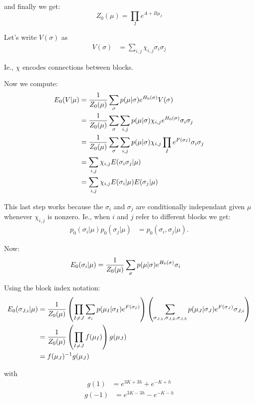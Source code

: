 \documentclass[11pt]{article}
\begin{document}
and finally we get:
$$\boxed{Z_{0}(\mu) = \prod_{I} e^{A+B\mu_{I}}}$$


Let's write $V(\sigma)$ as
\begin{align*}
V(\sigma) &= \sum_{i,j} \chi_{i,j}\sigma_{i}\sigma_{j}
\end{align*}

Ie., $\chi$ encodes connections between blocks.

Now we compute:
\begin{align*}
E_{0}(V | \mu) &= {{1} \over {Z_{0}(\mu)}}\sum_{\sigma} p(\mu | \sigma)e^{H_{0}(\sigma)}V(\sigma)\\
 &= {{1} \over {Z_{0}(\mu)}}\sum_{\sigma} \sum_{i,j} p(\mu | \sigma)\chi_{i,j}e^{H_{0}(\sigma)}\sigma_{i}\sigma_{j}\\
 &= {{1} \over {Z_{0}(\mu)}}\sum_{\sigma} \sum_{i,j} p(\mu | \sigma)\chi_{i,j}\prod_{I} e^{F(\sigma_{I})}\sigma_{i}\sigma_{j}\\
 &= \sum_{i,j} \chi_{i,j}E(\sigma_{i}\sigma_{j} | \mu)\\
 &= \sum_{i,j} \chi_{i,j}E(\sigma_{i} | \mu)E(\sigma_{j} | \mu)
\end{align*}

This last step works because the $\sigma_i$ and $\sigma_j$ are
conditionally independant given $\mu$ whenever $\chi_{i, j}$ is
nonzero. Ie., when $i$ and $j$ refer to different blocks we get:
\begin{align*}
p_{0}(\sigma_{i} | \mu)p_{0}(\sigma_{j} | \mu) &= p_{0}(\sigma_{i}, \sigma_{j} | \mu).
\end{align*}

Now:
\begin{align*}
E_{0}(\sigma_{i} | \mu) &= {{1} \over {Z_{0}(\mu)}}\sum_{\sigma} p(\mu | \sigma)e^{H_{0}(\sigma)}\sigma_{i}
\end{align*}

Using the block index notation:
\begin{align*}
E_{0}(\sigma_{J,i} | \mu) &= {{1} \over {Z_{0}(\mu)}}\left({\prod_{I \not = J} \sum_{\sigma_{i}} p(\mu_{I} | \sigma_{I})e^{F(\sigma_{I})}}\right)\left({\sum_{\sigma_{J,1},\sigma_{J,2},\sigma_{J,3}} p(\mu_{J} | \sigma_{J})e^{F(\sigma_{J})}\sigma_{J,i}}\right)\\
 &= {{1} \over {Z_{0}(\mu)}}\left({\prod_{I \not = J} f(\mu_{I})}\right)g(\mu_{J})\\
 &= f(\mu_{J})^{-1}g(\mu_{J})
\end{align*}

with
\begin{align*}
g(1) &= e^{3K+3h}+e^{-K+h}
\end{align*}
\begin{align*}
g(-1) &= e^{3K-3h}-e^{-K-h}
\end{align*}
\end{document}

